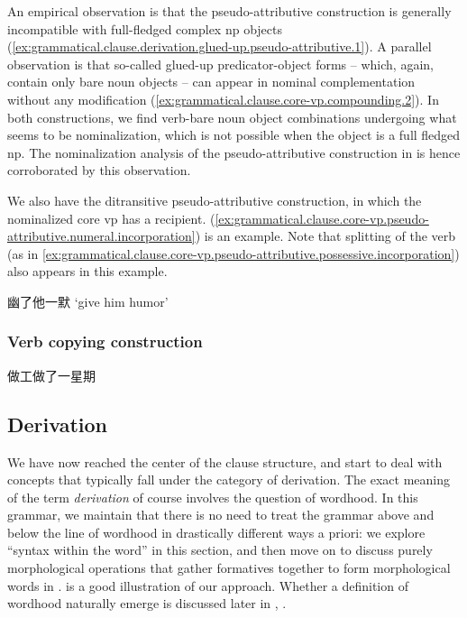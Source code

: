 \documentclass[UTF8, a4paper, oneside, scheme=plain, 12pt]{ctexrep}
\newcommand*{\term}[1]{\emph{#1}}
\newcommand{\translate}[1]{`#1'}
\begin{document}
An empirical observation is that the pseudo-attributive construction
is generally incompatible with full-fledged complex \ac{np} objects
(\ref{ex:grammatical.clause.derivation.glued-up.pseudo-attributive.1}).
A parallel observation is that 
so-called glued-up predicator-object forms -- which, again, contain only bare noun objects --
can appear in nominal complementation without any modification
(\ref{ex:grammatical.clause.core-vp.compounding.2}).
In both constructions, we find verb-bare noun object combinations undergoing
what seems to be nominalization,
which is not possible when the object is a full fledged \ac{np}.
The nominalization analysis of the pseudo-attributive construction in \citet{huang2008}
is hence corroborated by this observation.

We also have the ditransitive pseudo-attributive construction,
in which the nominalized core \ac{vp} has a recipient.
(\ref{ex:grammatical.clause.core-vp.pseudo-attributive.numeral.incorporation})
is an example.
Note that splitting of the verb (as in \ref{ex:grammatical.clause.core-vp.pseudo-attributive.possessive.incorporation}) also appears in this example.

\begin{exe}
    \ex\label{ex:grammatical.clause.core-vp.pseudo-attributive.numeral.incorporation} 幽了他一默 \translate{give him humor}
\end{exe}

\subsubsection{Verb copying construction}

\begin{exe}
    \ex 做工做了一星期
\end{exe}

\subsection{Derivation}\label{sec:grammatical.clause.core-vp.derivation}

We have now reached the center of the clause structure,
and start to deal with concepts that typically fall under the category of derivation.
The exact meaning of the term \term{derivation} of course involves the question of wordhood.
In this grammar, we maintain that there is no need to treat the grammar above and below the line of wordhood
in drastically different ways a priori: we explore ``syntax within the word'' in this section,
and then move on to discuss purely morphological operations that gather formatives together to form morphological words in .
 is a good illustration of our approach.
Whether a definition of wordhood naturally emerge is discussed later in
, .
\end{document}

